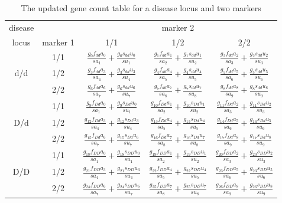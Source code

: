 \begin{table}[h]
\centering
\caption{The updated gene count table for a disease locus and two markers\label{threethreeu}}
\vskip 0.3cm
\begin{tabular}{ccccc}
\hline
disease&& \multicolumn{3}{c}{marker 2}\\ \cline{3-5}
locus& marker 1& 1/1 & 1/2 & 2/2 \\
\hline
    & 1/1 &   $\frac{g_{0}  f_{dd}a_{0}}{sa_1}+\frac{g_{0}  s_{dd}u_{0}}{su_1}$ &
              $\frac{g_{1}  f_{dd}a_{1}}{sa_2}+\frac{g_{1}  s_{dd}u_{1}}{su_2}$ &
              $\frac{g_{2}  f_{dd}a_{2}}{sa_3}+\frac{g_{2}  s_{dd}u_{2}}{su_3}$ \\
 d/d& 1/2 &   $\frac{g_{3}  f_{dd}a_{3}}{sa_4}+\frac{g_{3}  s_{dd}u_{3}}{su_4}$ &
              $\frac{g_{4}  f_{dd}a_{4}}{sa_5}+\frac{g_{4}  s_{dd}u_{4}}{su_5}$ &
              $\frac{g_{5}  f_{dd}a_{5}}{sa_6}+\frac{g_{5}  s_{dd}u_{5}}{su_6}$ \\
    & 2/2 &   $\frac{g_{6}  f_{dd}a_{6}}{sa_7}+\frac{g_{6}  s_{dd}u_{6}}{su_7}$ &
              $\frac{g_{7}  f_{dd}a_{7}}{sa_8}+\frac{g_{7}  s_{dd}u_{7}}{su_8}$ &
              $\frac{g_{8}  f_{dd}a_{8}}{sa_9}+\frac{g_{8}  s_{dd}u_{8}}{su_9}$ \\
    & 1/1 &   $\frac{g_{9}  f_{Dd}a_{0}}{sa_1}+\frac{g_{9}  s_{Dd}u_{0}}{su_1}$ &
              $\frac{g_{10} f_{Dd}a_{1}}{sa_2}+\frac{g_{10} s_{Dd}u_{1}}{su_2}$ &
              $\frac{g_{11} f_{Dd}a_{2}}{sa_3}+\frac{g_{11} s_{Dd}u_{2}}{su_3}$ \\
 D/d& 1/2 &   $\frac{g_{12} f_{Dd}a_{3}}{sa_4}+\frac{g_{12} s_{Dd}u_{3}}{su_4}$ &
              $\frac{g_{13} f_{Dd}a_{4}}{sa_5}+\frac{g_{13} s_{Dd}u_{4}}{su_5}$ &
              $\frac{g_{14} f_{Dd}a_{5}}{sa_6}+\frac{g_{14} s_{Dd}u_{5}}{su_6}$ \\
    & 2/2 &   $\frac{g_{15} f_{Dd}a_{6}}{sa_7}+\frac{g_{15} s_{Dd}u_{6}}{su_7}$ &
              $\frac{g_{16} f_{Dd}a_{7}}{sa_8}+\frac{g_{16} s_{Dd}u_{7}}{su_8}$ &
              $\frac{g_{17} f_{Dd}a_{8}}{sa_9}+\frac{g_{17} s_{Dd}u_{8}}{su_9}$ \\
    & 1/1 &   $\frac{g_{18} f_{DD}a_{0}}{sa_1}+\frac{g_{18} s_{DD}u_{0}}{su_1}$ &
              $\frac{g_{19} f_{DD}a_{1}}{sa_2}+\frac{g_{19} s_{DD}u_{1}}{su_2}$ &
              $\frac{g_{20} f_{DD}a_{2}}{sa_3}+\frac{g_{20} s_{DD}u_{2}}{su_3}$ \\
 D/D& 1/2 &   $\frac{g_{21} f_{DD}a_{3}}{sa_4}+\frac{g_{21} s_{DD}u_{3}}{su_4}$ &
              $\frac{g_{22} f_{DD}a_{4}}{sa_5}+\frac{g_{22} s_{DD}u_{4}}{su_5}$ &
              $\frac{g_{23} f_{DD}a_{5}}{sa_6}+\frac{g_{23} s_{DD}u_{5}}{su_6}$ \\
    & 2/2 &   $\frac{g_{24} f_{DD}a_{6}}{sa_7}+\frac{g_{24} s_{DD}u_{6}}{su_7}$ &
              $\frac{g_{25} f_{DD}a_{7}}{sa_8}+\frac{g_{25} s_{DD}u_{7}}{su_8}$ &
              $\frac{g_{26} f_{DD}a_{8}}{sa_9}+\frac{g_{26} s_{DD}u_{8}}{su_9}$ \\
\hline
\end{tabular}
\end{table}

